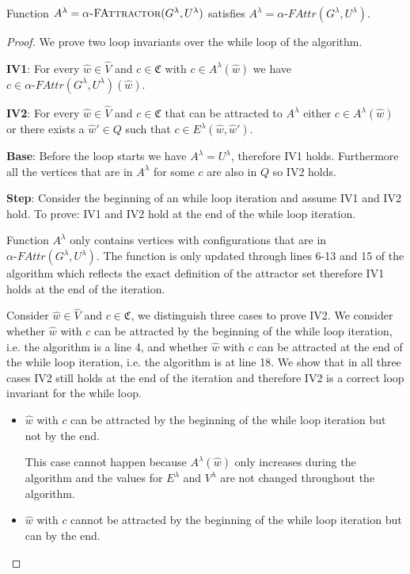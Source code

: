 \begin{theorem}
Function $A^\lambda = \textsc{$\alpha$-FAttractor}(G^\lambda,U^\lambda)$ satisfies $A^\lambda = \alpha\textit{-FAttr}(G^\lambda,U^\lambda)$.
	\begin{proof} We prove two loop invariants over the while loop of the algorithm.
		
		\textbf{IV1}: For every $\hat{w} \in \hat{V}$ and $c \in \mathfrak{C}$ with $c \in A^\lambda(\hat{w})$ we have $c \in \alpha\textit{-FAttr}(G^\lambda,U^\lambda)(\hat{w})$.
		
		\textbf{IV2}: For every $\hat{w} \in \hat{V}$ and $c \in \mathfrak{C}$ that can be attracted to $A^\lambda$ either $c \in A^\lambda(\hat{w})$ or there exists a $\hat{w}' \in Q$ such that $c \in E^\lambda(\hat{w},\hat{w}')$.
		
		\textbf{Base}: Before the loop starts we have $A^\lambda = U^\lambda$, therefore IV1 holds. Furthermore all the vertices that are in $A^\lambda$ for some $c$ are also in $Q$ so IV2 holds.
		
		\textbf{Step}: Consider the beginning of an while loop iteration and assume IV1 and IV2 hold. To prove: IV1 and IV2 hold at the end of the while loop iteration.
		
		Function $A^\lambda$ only contains vertices with configurations that are in $\alpha\textit{-FAttr}(G^\lambda,U^\lambda)$. The function is only updated through lines 6-13 and 15 of the algorithm which reflects the exact definition of the attractor set therefore IV1 holds at the end of the iteration.
		
		Consider $\hat{w} \in \hat{V}$ and $c \in \mathfrak{C}$, we distinguish three cases to prove IV2. We consider whether $\hat{w}$ with $c$ can be attracted by the beginning of the while loop iteration, i.e. the algorithm is a line 4, and whether $\hat{w}$ with $c$ can be attracted at the end of the while loop iteration, i.e. the algorithm is at line 18. We show that in all three cases IV2 still holds at the end of the iteration and therefore IV2 is a correct loop invariant for the while loop.
		\begin{itemize}
			\item $\hat{w}$ with $c$ can be attracted by the beginning of the while loop iteration but not by the end.
			
			This case cannot happen because $A^\lambda(\hat{w})$ only increases during the algorithm and the values for $E^\lambda$ and $V^\lambda$ are not changed throughout the algorithm.
			\item $\hat{w}$ with $c$ cannot be attracted by the beginning of the while loop iteration but can by the end.
			

\end{itemize}
\end{proof}
\end{theorem}
